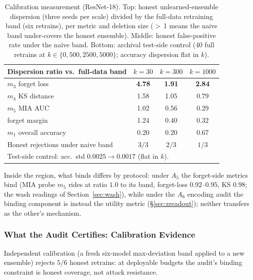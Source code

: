 \documentclass[lettersize,journal]{IEEEtran}
\begin{document}
\begin{table}[t]
\caption{Calibration measurement (ResNet-18). Top: honest
unlearned-ensemble dispersion (three seeds per scale) divided
by the full-data retraining band (six retrains), per metric and
deletion size ($>$\,1 means the naive band under-covers the honest
ensemble). Middle: honest false-positive rate under the naive band.
Bottom: archival test-side control (40 full retrains at
$k \in \{0,500,2500,5000\}$; accuracy dispersion flat in $k$).}
\label{tab:calibration}
\centering
\small
\setlength{\tabcolsep}{4pt}
\begin{tabular}{lccc}
\toprule
Dispersion ratio vs.\ full-data band & $k{=}30$ & $k{=}300$ & $k{=}1000$ \\
\midrule
$m_3$ forget loss      & \textbf{4.78} & \textbf{1.91} & \textbf{2.84} \\
$m_4$ KS distance      & 1.58 & 1.05 & 0.79 \\
$m_5$ MIA AUC          & 1.02 & 0.56 & 0.29 \\
forget margin          & 1.24 & 0.40 & 0.32 \\
$m_1$ overall accuracy & 0.20 & 0.20 & 0.67 \\
\midrule
Honest rejections under naive band & $3/3$ & $2/3$ & $1/3$ \\
\midrule
\multicolumn{4}{l}{Test-side control: acc.\ std $0.0025 \to 0.0017$
(flat in $k$).}\\
\bottomrule
\end{tabular}
\end{table}

Inside the region, what binds differs by protocol: under
$A_5$ the forget-side metrics bind (MIA probe $m_5$ rides at
ratio $1.0$ to its band, forget-loss $0.92$--$0.95$, KS
$0.98$; the wash readings of Section~\ref{sec:wash}), while
under the $A_6$ encoding audit the binding component is
instead the utility metric (\S\ref{sec:zreadout}); neither
transfers as the other's mechanism.

\subsubsection{What the Audit Certifies: Calibration Evidence}\label{sec:approx-op}
Independent calibration (a fresh six-model max-deviation
band applied to a new ensemble) rejects $5/6$ honest
retrains: at deployable budgets the audit's binding
constraint is honest coverage, not attack resistance.
\end{document}
